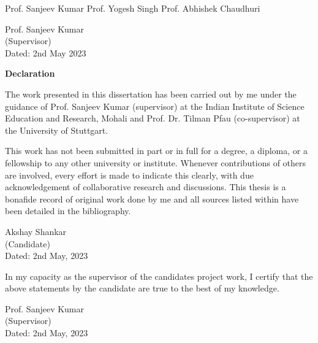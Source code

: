 \documentclass[titlepage]{report}
\begin{document}
\vspace{4cm}

Prof. Sanjeev Kumar \hspace{1.5cm} Prof. Yogesh Singh \hspace{1.5cm} Prof. Abhishek Chaudhuri

\vspace{4cm}

\begin{flushright}
  Prof. Sanjeev Kumar
  \\
  (Supervisor)
  \\
  \vspace{4cm}
  Dated: 2nd May 2023
\end{flushright}

\cleardoublepage
\addtocounter{page}{-1}%

\begin{center}
  \textbf{\Large Declaration}
\end{center}
The work presented in this dissertation has been carried out by me under the guidance of Prof. Sanjeev Kumar (supervisor) at the Indian Institute of Science Education and Research, Mohali and Prof. Dr. Tilman Pfau (co-supervisor) at the University of Stuttgart.

\vspace{0.4cm}

This work has not been submitted in part or in full for a degree, a diploma, or a fellowship to any other university or institute. Whenever contributions of others are involved, every effort is made to indicate this clearly, with due acknowledgement of collaborative research and discussions. This thesis is a bonafide record of original work done by me and all sources listed within have been detailed in the bibliography.

\vspace{2cm}

\begin{flushright}
Akshay Shankar
\\
(Candidate)
\\
Dated: 2nd May, 2023
\end{flushright}

In my capacity as the supervisor of the candidates project work, I certify that the above statements by the candidate are true to the best of my knowledge.

\vspace{2cm}

\begin{flushright}
Prof. Sanjeev Kumar
\\
(Supervisor)
\\
Dated: 2nd May, 2023
\end{flushright}
\end{document}
